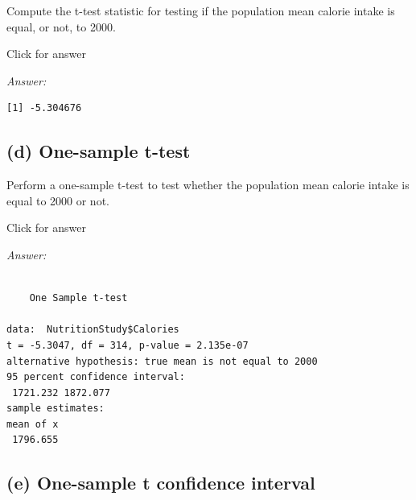\documentclass[
]{book}
\newenvironment{Shaded}{\begin{snugshade}}{\end{snugshade}}
\newcommand{\AttributeTok}[1]{\textcolor[rgb]{0.77,0.63,0.00}{#1}}
\newcommand{\DecValTok}[1]{\textcolor[rgb]{0.00,0.00,0.81}{#1}}
\newcommand{\FunctionTok}[1]{\textcolor[rgb]{0.00,0.00,0.00}{#1}}
\newcommand{\NormalTok}[1]{#1}
\newcommand{\OtherTok}[1]{\textcolor[rgb]{0.56,0.35,0.01}{#1}}
\newcommand{\SpecialCharTok}[1]{\textcolor[rgb]{0.00,0.00,0.00}{#1}}
\begin{document}
Compute the t-test statistic for testing if the population mean calorie intake is equal, or not, to 2000.

Click for answer

\emph{Answer:}

\begin{Shaded}
\end{Shaded}

\begin{verbatim}
[1] -5.304676
\end{verbatim}

\hypertarget{d-one-sample-t-test-1}{%
\subsection{(d) One-sample t-test}\label{d-one-sample-t-test-1}}

Perform a one-sample t-test to test whether the population mean calorie intake is equal to 2000 or not.

Click for answer

\emph{Answer:}

\begin{Shaded}
\end{Shaded}

\begin{verbatim}

    One Sample t-test

data:  NutritionStudy$Calories
t = -5.3047, df = 314, p-value = 2.135e-07
alternative hypothesis: true mean is not equal to 2000
95 percent confidence interval:
 1721.232 1872.077
sample estimates:
mean of x 
 1796.655 
\end{verbatim}

\hypertarget{e-one-sample-t-confidence-interval-1}{%
\subsection{(e) One-sample t confidence interval}\label{e-one-sample-t-confidence-interval-1}}
\end{document}
